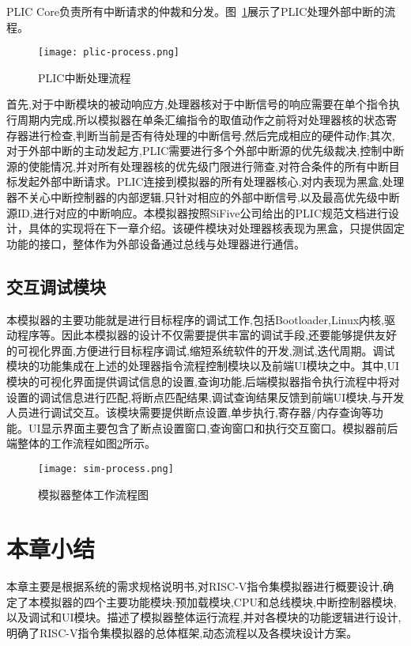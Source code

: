 PLIC Core负责所有中断请求的仲裁和分发。图~\ref{fig:plic-process}展示了PLIC处理外部中断的流程。
\begin{figure}[h]
    \centering
    \texttt{[image: plic-process.png]}
    \caption{PLIC中断处理流程}
    \label{fig:plic-process}
\end{figure}

首先,对于中断模块的被动响应方,处理器核对于中断信号的响应需要在单个指令执行周期内完成,所以模拟器在单条汇编指令的取值动作之前将对处理器核的状态寄存器进行检查,判断当前是否有待处理的中断信号,然后完成相应的硬件动作;其次,对于外部中断的主动发起方,PLIC需要进行多个外部中断源的优先级裁决,控制中断源的使能情况,并对所有处理器核的优先级门限进行筛查,对符合条件的所有中断目标发起外部中断请求。PLIC连接到模拟器的所有处理器核心,对内表现为黑盒,处理器不关心中断控制器的内部逻辑,只针对相应的外部中断信号,以及最高优先级中断源ID,进行对应的中断响应。本模拟器按照SiFive公司给出的PLIC规范文档进行设计，具体的实现将在下一章介绍。该硬件模块对处理器核表现为黑盒，只提供固定功能的接口，整体作为外部设备通过总线与处理器进行通信。

\subsection{交互调试模块}
本模拟器的主要功能就是进行目标程序的调试工作,包括Bootloader,Linux内核,驱动程序等。因此本模拟器的设计不仅需要提供丰富的调试手段,还要能够提供友好的可视化界面,方便进行目标程序调试,缩短系统软件的开发,测试,迭代周期。调试模块的功能集成在上述的处理器指令流程控制模块以及前端UI模块之中。其中,UI模块的可视化界面提供调试信息的设置,查询功能,后端模拟器指令执行流程中将对设置的调试信息进行匹配,将断点匹配结果,调试查询结果反馈到前端UI模块,与开发人员进行调试交互。该模块需要提供断点设置,单步执行,寄存器/内存查询等功能。UI显示界面主要包含了断点设置窗口,查询窗口和执行交互窗口。模拟器前后端整体的工作流程如图\ref{fig:work-frame}所示。
\begin{figure}[H]
  \centering
  \texttt{[image: sim-process.png]}
  \caption{模拟器整体工作流程图}
  \label{fig:work-frame}
\end{figure}

\section{本章小结}
本章主要是根据系统的需求规格说明书,对RISC-V指令集模拟器进行概要设计,确定了本模拟器的四个主要功能模块:预加载模块,CPU和总线模块,中断控制器模块,以及调试和UI模块。描述了模拟器整体运行流程,并对各模块的功能逻辑进行设计,明确了RISC-V指令集模拟器的总体框架,动态流程以及各模块设计方案。